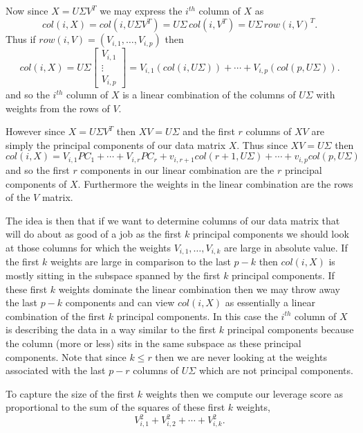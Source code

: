 \documentclass{book}
\begin{document}
Now since $X=U\Sigma V^T$ we may express the $i^{th}$ column of $X$ as 
$$
col(i,X)=col(i,U\Sigma V^T)=U\Sigma\,col(i,V^T)=U\Sigma\,row(i,V)^T.
$$
Thus if $row(i,V)=(V_{i,1},\ldots,V_{i,p})$ then
$$
col(i,X)=U\Sigma
\begin{bmatrix}
V_{i,1}\\
\vdots\\
V_{i,p}
\end{bmatrix}
=V_{i,1}(col(i,U\Sigma))+\cdots+V_{i,p}(col(p,U\Sigma)).
$$
and so the $i^{th}$ column of $X$ is a linear combination of the columns of $U\Sigma$ with weights from the rows of $V$. 

However since $X=U\Sigma V^T$ then $XV=U\Sigma$ and the first $r$ columns of $XV$ are simply the principal components of our data matrix $X$. Thus since $XV=U\Sigma$ then
$$
col(i,X)=V_{i,1}PC_1+\cdots+V_{i,r}PC_r+v_{i,r+1}col(r+1,U\Sigma)+\cdots+v_{i,p}col(p,U\Sigma)
$$
and so the first $r$ components in our linear combination are the $r$ principal components of $X$. Furthermore the weights in the linear combination are the rows of the $V$ matrix. 

The idea is then that if we want to determine columns of our data matrix that will do about as good of a job as the first $k$ principal components we should look at those columns for which the weights $V_{i,1},\ldots,V_{i,k}$ are large in absolute value. If the first $k$ weights are large in comparison to the last $p-k$ then $col(i,X)$ is mostly sitting in the subspace spanned by the first $k$ principal components. If these first $k$ weights dominate the linear combination then we may throw away the last $p-k$ components and can view $col(i,X)$ as essentially a linear combination of the first $k$ principal components. In this case the $i^{th}$ column of $X$ is describing the data in a way similar to the first $k$ principal components because the column (more or less) sits in the same subspace as these principal components. Note that since $k \leq r$ then we are never looking at the weights associated with the last $p-r$ columns of $U\Sigma$ which are not principal components. 

To capture the size of the first $k$ weights then we compute our leverage score as proportional to the sum of the squares of these first $k$ weights, 
$$
V_{i,1}^2+V_{i,2}^2+\cdots+V_{i,k}^2.
$$
\end{document}
